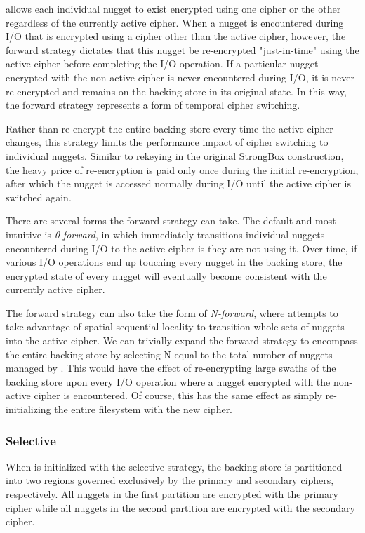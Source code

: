 \SYSTEM{} allows each individual nugget to exist encrypted using one cipher or
the other regardless of the currently active cipher. When a nugget is
encountered during I/O that is encrypted using a cipher other than the active
cipher, however, the forward strategy dictates that this nugget be re-encrypted
"just-in-time" using the active cipher before completing the I/O operation. If a
particular nugget encrypted with the non-active cipher is never encountered
during I/O, it is never re-encrypted and remains on the backing store in its
original state. In this way, the forward strategy represents a form of temporal
cipher switching.

Rather than re-encrypt the entire backing store every time the active cipher
changes, this strategy limits the performance impact of cipher switching to
individual nuggets. Similar to rekeying in the original StrongBox construction,
the heavy price of re-encryption is paid only once during the initial
re-encryption, after which the nugget is accessed normally during I/O until the
active cipher is switched again.

There are several forms the forward strategy can take. The default and most
intuitive is \emph{0-forward}, in which \SYSTEM{} immediately transitions
individual nuggets encountered during I/O to the active cipher is they are not
using it. Over time, if various I/O operations end up touching every nugget in
the backing store, the encrypted state of every nugget will eventually become
consistent with the currently active cipher.

The forward strategy can also take the form of \emph{N-forward}, where \SYSTEM{}
attempts to take advantage of spatial sequential locality to transition whole
sets of nuggets into the active cipher. We can trivially expand the forward
strategy to encompass the entire backing store by selecting N equal to the total
number of nuggets managed by \SYSTEM{}. This would have the effect of
re-encrypting large swaths of the backing store upon every I/O operation where a
nugget encrypted with the non-active cipher is encountered. Of course, this has
the same effect as simply re-initializing the entire filesystem with the new
cipher.

\subsubsection{Selective}

When \SYSTEM{} is initialized with the selective strategy, the backing store is
partitioned into two regions governed exclusively by the primary and secondary
ciphers, respectively. All nuggets in the first partition are encrypted with the
primary cipher while all nuggets in the second partition are encrypted with the
secondary cipher.

